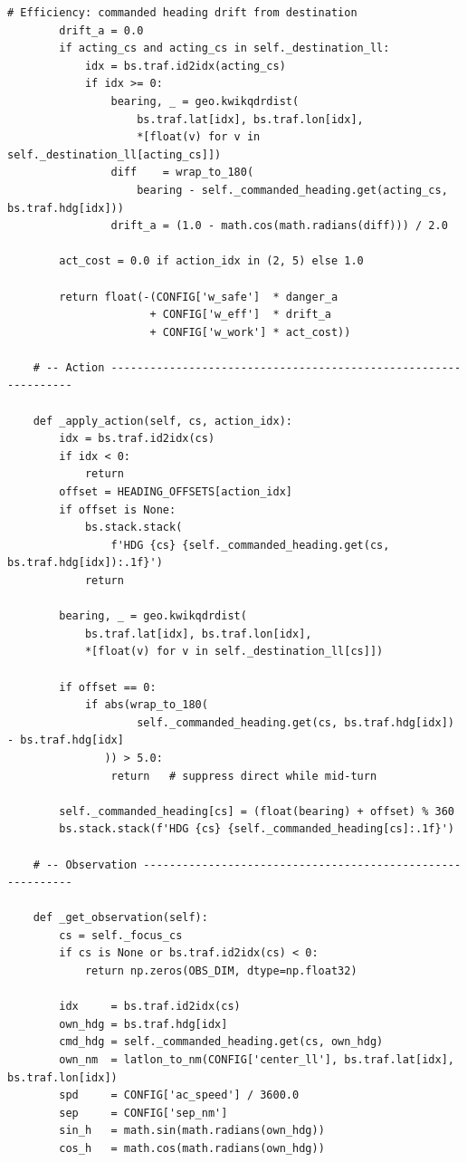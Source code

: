 \documentclass[10pt, a4paper]{article}
\begin{document}
\begin{lstlisting}[caption={v3\_simple\_env.py --- ATCO conflict-resolution environment}, label=lst:env]
        # Efficiency: commanded heading drift from destination
        drift_a = 0.0
        if acting_cs and acting_cs in self._destination_ll:
            idx = bs.traf.id2idx(acting_cs)
            if idx >= 0:
                bearing, _ = geo.kwikqdrdist(
                    bs.traf.lat[idx], bs.traf.lon[idx],
                    *[float(v) for v in self._destination_ll[acting_cs]])
                diff    = wrap_to_180(
                    bearing - self._commanded_heading.get(acting_cs, bs.traf.hdg[idx]))
                drift_a = (1.0 - math.cos(math.radians(diff))) / 2.0

        act_cost = 0.0 if action_idx in (2, 5) else 1.0

        return float(-(CONFIG['w_safe']  * danger_a
                      + CONFIG['w_eff']  * drift_a
                      + CONFIG['w_work'] * act_cost))

    # -- Action ----------------------------------------------------------------

    def _apply_action(self, cs, action_idx):
        idx = bs.traf.id2idx(cs)
        if idx < 0:
            return
        offset = HEADING_OFFSETS[action_idx]
        if offset is None:
            bs.stack.stack(
                f'HDG {cs} {self._commanded_heading.get(cs, bs.traf.hdg[idx]):.1f}')
            return

        bearing, _ = geo.kwikqdrdist(
            bs.traf.lat[idx], bs.traf.lon[idx],
            *[float(v) for v in self._destination_ll[cs]])

        if offset == 0:
            if abs(wrap_to_180(
                    self._commanded_heading.get(cs, bs.traf.hdg[idx]) - bs.traf.hdg[idx]
               )) > 5.0:
                return   # suppress direct while mid-turn

        self._commanded_heading[cs] = (float(bearing) + offset) % 360
        bs.stack.stack(f'HDG {cs} {self._commanded_heading[cs]:.1f}')

    # -- Observation -----------------------------------------------------------

    def _get_observation(self):
        cs = self._focus_cs
        if cs is None or bs.traf.id2idx(cs) < 0:
            return np.zeros(OBS_DIM, dtype=np.float32)

        idx     = bs.traf.id2idx(cs)
        own_hdg = bs.traf.hdg[idx]
        cmd_hdg = self._commanded_heading.get(cs, own_hdg)
        own_nm  = latlon_to_nm(CONFIG['center_ll'], bs.traf.lat[idx], bs.traf.lon[idx])
        spd     = CONFIG['ac_speed'] / 3600.0
        sep     = CONFIG['sep_nm']
        sin_h   = math.sin(math.radians(own_hdg))
        cos_h   = math.cos(math.radians(own_hdg))


\end{lstlisting}
\end{document}

